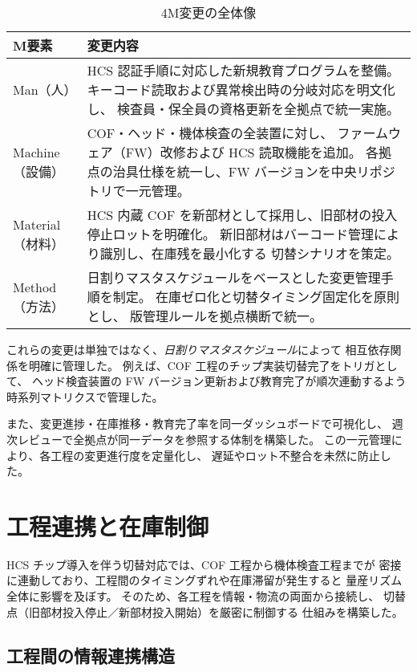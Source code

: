 \documentclass[journal,twocolumn]{IEEEtran}
\begin{document}
\begin{table}[t]
\caption{4M変更の全体像}
\label{tab:4m}
\centering
\begin{tabularx}{\columnwidth}{@{}l X@{}}
\toprule
M要素 & 変更内容 \\
\midrule
Man（人） &
HCS 認証手順に対応した新規教育プログラムを整備。
キーコード読取および異常検出時の分岐対応を明文化し、
検査員・保全員の資格更新を全拠点で統一実施。 \\[2pt]

Machine（設備） &
COF・ヘッド・機体検査の全装置に対し、
ファームウェア（FW）改修および HCS 読取機能を追加。
各拠点の治具仕様を統一し、FW バージョンを中央リポジトリで一元管理。 \\[2pt]

Material（材料） &
HCS 内蔵 COF を新部材として採用し、旧部材の投入停止ロットを明確化。
新旧部材はバーコード管理により識別し、在庫残を最小化する
切替シナリオを策定。 \\[2pt]

Method（方法） &
日割りマスタスケジュールをベースとした変更管理手順を制定。
在庫ゼロ化と切替タイミング固定化を原則とし、
版管理ルールを拠点横断で統一。 \\
\bottomrule
\end{tabularx}
\end{table}

これらの変更は単独ではなく、\emph{日割りマスタスケジュール}によって
相互依存関係を明確に管理した。
例えば、COF 工程のチップ実装切替完了をトリガとして、
ヘッド検査装置の FW バージョン更新および教育完了が順次連動するよう
時系列マトリクスで管理した。

また、変更進捗・在庫推移・教育完了率を同一ダッシュボードで可視化し、
週次レビューで全拠点が同一データを参照する体制を構築した。
この一元管理により、各工程の変更進行度を定量化し、
遅延やロット不整合を未然に防止した。

\section{工程連携と在庫制御}

HCS チップ導入を伴う切替対応では、COF 工程から機体検査工程までが
密接に連動しており、工程間のタイミングずれや在庫滞留が発生すると
量産リズム全体に影響を及ぼす。
そのため、各工程を情報・物流の両面から接続し、
切替点（旧部材投入停止／新部材投入開始）を厳密に制御する
仕組みを構築した。

\subsection{工程間の情報連携構造}
\end{document}
